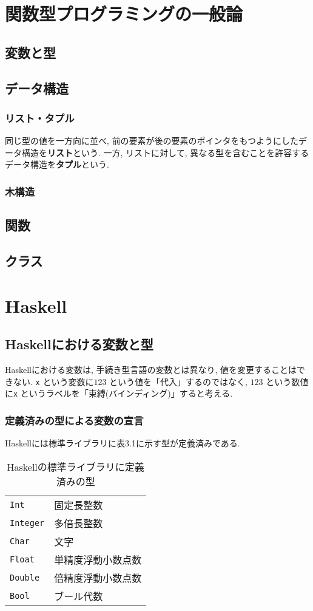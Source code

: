 \section{関数型プログラミングの一般論}
\subsection{変数と型}
\subsection{データ構造}
\subsubsection{リスト・タプル}
同じ型の値を一方向に並べ, 前の要素が後の要素のポインタをもつようにしたデータ構造を{\bf リスト}という.
一方, リストに対して, 異なる型を含むことを許容するデータ構造を{\bf タプル}という.
\subsubsection{木構造}
\subsection{関数}
\subsection{クラス}
\section{Haskell}
\subsection{Haskellにおける変数と型}
Haskellにおける変数は, 手続き型言語の変数とは異なり, 値を変更することはできない. \verb|x| という変数に$123$ という値を「代入」するのではなく, $123$ という数値に\verb|x| というラベルを「束縛(バインディング)」すると考える.

\subsubsection{定義済みの型による変数の宣言}
Haskellには標準ライブラリに表3.1に示す型が定義済みである.
\begin{table}[htbp]
\caption{Haskellの標準ライブラリに定義済みの型}
\begin{center}
\begin{tabular}{ll}
\verb|Int|&固定長整数\\
\verb|Integer|&多倍長整数 \\
\verb|Char|&文字\\
\verb|Float|&単精度浮動小数点数\\
\verb|Double|&倍精度浮動小数点数\\
\verb|Bool|&ブール代数\\
\end{tabular}
\end{center}
\end{table}

